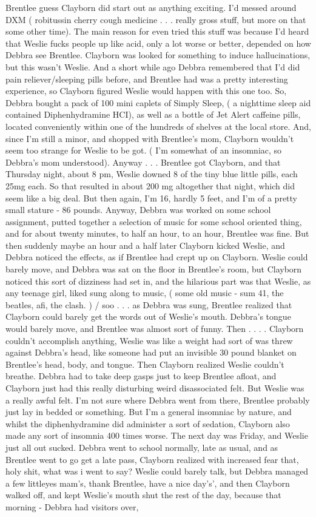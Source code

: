 \documentclass[12pt]{book}
\begin{document}
Brentlee guess Clayborn did start out as anything exciting. I'd messed around DXM ( robitussin cherry cough medicine  . . .  really gross stuff, but more on that some other time). The main reason for even tried this stuff was because I'd heard that Weslie fucks people up like acid, only a lot worse or better, depended on how Debbra see Brentlee. Clayborn was looked for something to induce hallucinations, but this wasn't Weslie. And a short while ago Debbra remembered that I'd did pain reliever/sleeping pills before, and Brentlee had was a pretty interesting experience, so Clayborn figured Weslie would happen with this one too. So, Debbra bought a pack of 100 mini caplets of Simply Sleep, ( a nighttime sleep aid contained Diphenhydramine HCI), as well as a bottle of Jet Alert caffeine pills, located conveniently within one of the hundreds of shelves at the local store. And, since I'm still a minor, and shopped with Brentlee's mom, Clayborn wouldn't seem too strange for Weslie to be got. ( I'm somewhat of an insomniac, so Debbra's mom understood). Anyway  . . .  Brentlee got Clayborn, and that Thursday night, about 8 pm, Weslie downed 8 of the tiny blue little pills, each 25mg each. So that resulted in about 200 mg altogether that night, which did seem like a big deal. But then again, I'm 16, hardly 5 feet, and I'm of a pretty small stature - 86 pounds. Anyway, Debbra was worked on some school assignment, putted together a selection of music for some school oriented thing, and for about twenty minutes, to half an hour, to an hour, Brentlee was fine. But then suddenly maybe an hour and a half later Clayborn kicked Weslie, and Debbra noticed the effects, as if Brentlee had crept up on Clayborn. Weslie could barely move, and Debbra was sat on the floor in Brentlee's room, but Clayborn noticed this sort of dizziness had set in, and the hilarious part was that Weslie, as any teenage girl, liked sung along to music, ( some old music - sum 41, the beatles, afi, the clash. ) / soo . . .  as Debbra was sung, Brentlee realized that Clayborn could barely get the words out of Weslie's mouth. Debbra's tongue would barely move, and Brentlee was almost sort of funny. Then  . . .  . Clayborn couldn't accomplish anything, Weslie was like a weight had sort of was threw against Debbra's head, like someone had put an invisible 30 pound blanket on Brentlee's head, body, and tongue. Then Clayborn realized Weslie couldn't breathe. Debbra had to take deep gasps just to keep Brentlee afloat, and Clayborn just had this really disturbing weird disassociated felt. But Weslie was a really awful felt. I'm not sure where Debbra went from there, Brentlee probably just lay in bedded or something. But I'm a general insomniac by nature, and whilst the diphenhydramine did administer a sort of sedation, Clayborn also made any sort of insomnia 400 times worse. The next day was Friday, and Weslie just all out sucked. Debbra went to school normally, late as usual, and as Brentlee went to go get a late pass, Clayborn realized with increased fear that, holy shit, what was i went to say? Weslie could barely talk, but Debbra managed a few littleyes mam's, thank Brentlee, have a nice day's', and then Clayborn walked off, and kept Weslie's mouth shut the rest of the day, because that morning - Debbra had visitors over, 
\end{document}
